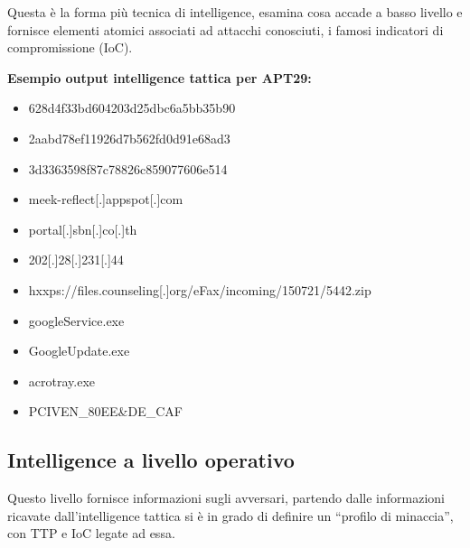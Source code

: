 Questa è la forma più tecnica di intelligence, esamina cosa accade a basso livello e fornisce elementi atomici associati ad attacchi conosciuti, i famosi indicatori di compromissione (IoC).

\begin{center}
    \noindent\textbf{Esempio output intelligence tattica per APT29:}\newline\newline
    \begin{varwidth}{\textwidth}
        \begin{itemize}
          \item 628d4f33bd604203d25dbc6a5bb35b90
          \item 2aabd78ef11926d7b562fd0d91e68ad3
          \item 3d3363598f87c78826c859077606e514
          \item meek-reflect[.]appspot[.]com
          \item portal[.]sbn[.]co[.]th
          \item 202[.]28[.]231[.]44
          \item hxxps://files.counseling[.]org/eFax/incoming/150721/5442.zip
          \item googleService.exe
          \item GoogleUpdate.exe
          \item acrotray.exe
          \item PCIVEN\_80EE\&DE\_CAF
        \end{itemize}
    \end{varwidth}
\end{center}

\newpage

\subsection{Intelligence a livello operativo}

Questo livello fornisce informazioni sugli avversari, partendo dalle informazioni ricavate dall’intelligence tattica si è in grado di definire un “profilo di minaccia”, con TTP e IoC legate ad essa.

